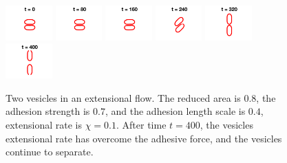 \documentclass[%
preprint,
 amsmath,amssymb,
 aps,
]{revtex4-1}
\begin{document}
\begin{figure}[htp]
  \includegraphics[width = 0.16\textwidth]{figs/extensional_adR4em1adS7em1Chi1em1_ra080_image01.png}
  \includegraphics[width = 0.16\textwidth]{figs/extensional_adR4em1adS7em1Chi1em1_ra080_image02.png}
  \includegraphics[width = 0.16\textwidth]{figs/extensional_adR4em1adS7em1Chi1em1_ra080_image03.png}
  \includegraphics[width = 0.16\textwidth]{figs/extensional_adR4em1adS7em1Chi1em1_ra080_image04.png}
  \includegraphics[width = 0.16\textwidth]{figs/extensional_adR4em1adS7em1Chi1em1_ra080_image05.png}
  \includegraphics[width = 0.16\textwidth]{figs/extensional_adR4em1adS7em1Chi1em1_ra080_image06.png}
  \caption{\label{fig:extensional3} Two vesicles in an extensional flow.
  The reduced area is $0.8$, the adhesion strength is $0.7$, and the
  adhesion length scale is $0.4$, extensional rate is $\chi = 0.1$.
  After time $t=400$, the vesicles extensional rate has overcome the
  adhesive force, and the vesicles continue to separate.}
\end{figure}
\end{document}
